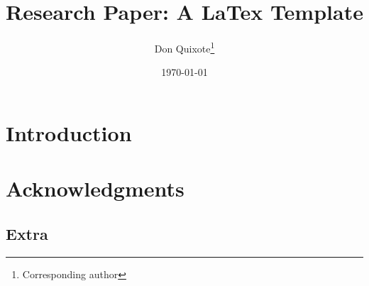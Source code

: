\documentclass[12pt]{research-paper}
\title{Research Paper: A LaTex Template}
\author{Don Quixote\thanks{Corresponding author}}
\affil{La Mancha}
\affil[ ]{\textit{\{email\}@lamancha.edu}}
\date{\today}
\begin{document}
	\maketitle
	
	\begin{abstract}
	
	\end{abstract}
	
	\toc
	
	\section{Introduction}\label{sec:intro}
	
	\section*{Acknowledgments}\label{sec:ack}
	
	
	\begin{appendices}
	
	\section{Extra}\label{sec:app}
		
	\end{appendices}
\end{document}
